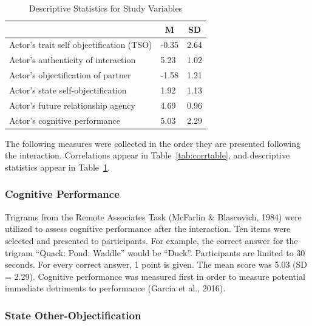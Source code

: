 \documentclass[man]{apa6}
\begin{document}
\begin{table}[tbp]
\begin{center}
\begin{threeparttable}
\caption{\label{tab:descriptives}Descriptive Statistics for Study Variables}
\begin{tabular}{lll}
\toprule
 & \multicolumn{1}{c}{M} & \multicolumn{1}{c}{SD}\\
\midrule
Actor's trait self objectification (TSO) & -0.35 & 2.64\\
Actor's authenticity of interaction & 5.23 & 1.02\\
Actor's objectification of partner & -1.58 & 1.21\\
Actor's state self-objectification & 1.92 & 1.13\\
Actor's future relationship agency & 4.69 & 0.96\\
Actor's cognitive performance & 5.03 & 2.29\\
\bottomrule
\end{tabular}
\end{threeparttable}
\end{center}
\end{table}

The following measures were collected in the order they are presented
following the interaction. Correlations appear in
Table~\ref{tab:corrtable}, and descriptive statistics appear in
Table~\ref{tab:descriptives}.

\subsubsection{Cognitive Performance}\label{cognitive-performance}

Trigrams from the Remote Associates Task (McFarlin \& Blascovich, 1984)
were utilized to assess cognitive performance after the interaction. Ten
items were selected and presented to participants. For example, the
correct answer for the trigram \enquote{Quack: Pond: Waddle} would be
\enquote{Duck}. Participants are limited to 30 seconds. For every
correct answer, 1 point is given. The mean score was 5.03 (SD = 2.29).
Cognitive performance was measured first in order to measure potential
immediate detriments to performance (Garcia et al., 2016).

\subsubsection{State
Other-Objectification}\label{state-other-objectification}
\end{document}
